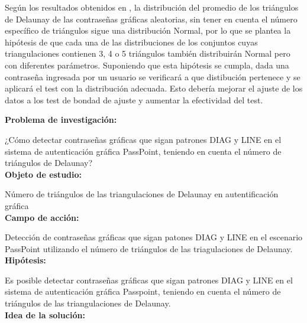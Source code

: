 \documentclass[12pt]{report}
\begin{document}
	
	Según los resultados obtenidos en \cite{13}, la distribución del promedio de los triángulos de  Delaunay de las contraseñas gráficas aleatorias, sin tener en cuenta el número específico de triángulos sigue una distribución Normal, por lo que se plantea la hipótesis de que cada una de las distribuciones de los conjuntos cuyas triangulaciones contienen 3, 4 o 5 triángulos también distribuirán Normal pero con diferentes parámetros. Suponiendo que esta hipótesis se cumpla, dada una contraseña ingresada por un usuario se verificará a que distibución pertenece y se aplicará el test con la distribución adecuada. Esto debería mejorar el ajuste de los datos a los test de bondad de ajuste y aumentar la efectividad del test.
	
	\large{\textbf{Problema de investigación:}}
	
	\normalsize{¿Cómo  detectar contraseñas gráficas que sigan patrones DIAG y LINE  en el sistema de autenticación gráfica PassPoint, teniendo en cuenta el número de triángulos de Delaunay?}\\
	
	\large{\textbf{Objeto de estudio:}}
	
	\normalsize{Número de triángulos de las  triangulaciones de Delaunay  en autentificación gráfica}\\
	
		   
	\large{\textbf{Campo de acción:}}
	
	\normalsize{Detección de contraseñas gráficas que sigan patones DIAG y LINE en el escenario PassPoint   utilizando  el número de triángulos de las triagulaciones de Delaunay}.\\
	 
	\large{\textbf{Hipótesis:}}

	\normalsize{Es posible detectar contraseñas gráficas que sigan patrones DIAG y LINE en el sistema de autenticación gráfica Passpoint, teniendo en cuenta el número de triángulos  de las triangulaciones de Delaunay}.\\
		
	
	\large{\textbf{Idea de la solución:}}
	
\end{document}
